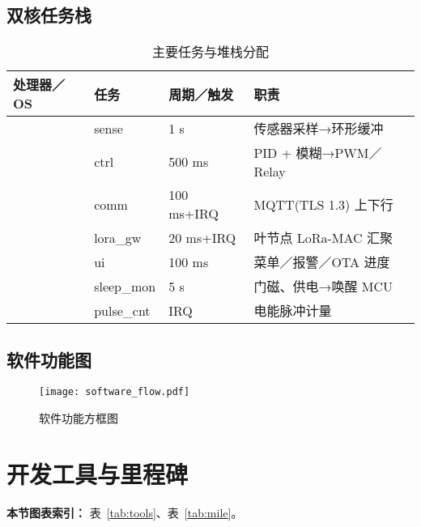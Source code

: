 \documentclass[UTF8,a4paper]{ctexart}
\newcommand{\tabfont}{\zihao{-5}}
\begin{document}
\subsection{双核任务栈}
\begin{table}[htbp]
    \centering
    \caption{主要任务与堆栈分配}
    \label{tab:tasks}
    \tabfont
    \begin{tabular}{@{}p{3cm}p{1.8cm}p{1.8cm}p{6cm}@{}}
        \toprule
        处理器／OS & 任务 & 周期／触发 & 职责 \\ \midrule
          & sense    & 1 s & 传感器采样→环形缓冲 \\
          & ctrl     & 500 ms & PID + 模糊→PWM／Relay \\
          & comm     & 100 ms+IRQ & MQTT(TLS 1.3) 上下行 \\
          & lora\_gw & 20 ms+IRQ & 叶节点 LoRa-MAC 汇聚 \\
          & ui       & 100 ms & 菜单／报警／OTA 进度 \\[2pt]
          & sleep\_mon & 5 s & 门磁、供电→唤醒 MCU \\
          & pulse\_cnt & IRQ & 电能脉冲计量 \\ \bottomrule
    \end{tabular}
\end{table}

\subsection{软件功能图}
\begin{figure}[htbp]
    \centering
    \texttt{[image: software\_flow.pdf]}
    \caption{软件功能方框图}
    \label{fig:soft}
\end{figure}

\section{开发工具与里程碑}
\textbf{本节图表索引：} 表~\ref{tab:tools}、表~\ref{tab:mile}。
\end{document}
